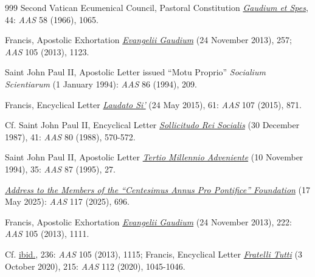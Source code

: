 \documentclass{article}
\begin{document}
\begin{thebibliography}{999}
 Second Vatican Ecumenical Council, Pastoral Constitution \href{https://www.vatican.va/archive/hist_councils/ii_vatican_council/documents/vat-ii_const_19651207_gaudium-et-spes_en.html}{\emph{Gaudium et Spes}}, 44: \emph{AAS} 58 (1966), 1065.

 Francis, Apostolic Exhortation \href{https://www.vatican.va/content/francesco/en/apost_exhortations/documents/papa-francesco_esortazione-ap_20131124_evangelii-gaudium.html}{\emph{Evangelii Gaudium}} (24 November 2013), 257; \emph{AAS} 105 (2013), 1123.

 Saint John Paul II, Apostolic Letter issued ``Motu Proprio'' \emph{Socialium Scientiarum} (1 January 1994): \emph{AAS} 86 (1994), 209.

 Francis, Encyclical Letter \href{https://www.vatican.va/content/francesco/en/encyclicals/documents/papa-francesco_20150524_enciclica-laudato-si.html}{\emph{Laudato Si'}} (24 May 2015), 61: \emph{AAS} 107 (2015), 871.

 Cf. Saint John Paul II, Encyclical Letter \href{https://www.vatican.va/content/john-paul-ii/en/encyclicals/documents/hf_jp-ii_enc_30121987_sollicitudo-rei-socialis.html}{\emph{Sollicitudo Rei Socialis}} (30 December 1987), 41: \emph{AAS} 80 (1988), 570-572.

 Saint John Paul II, Apostolic Letter \href{https://www.vatican.va/content/john-paul-ii/en/apost_letters/1994/documents/hf_jp-ii_apl_19941110_tertio-millennio-adveniente.html}{\emph{Tertio Millennio Adveniente}} (10 November 1994), 35: \emph{AAS} 87 (1995), 27.

 \href{https://www.vatican.va/content/leo-xiv/en/speeches/2025/may/documents/20250517-centesimus-annus-pro-pontifice.html}{\emph{Address to the Members of the ``Centesimus Annus Pro Pontifice'' Foundation}} (17 May 2025): \emph{AAS} 117 (2025), 696.

 Francis, Apostolic Exhortation \href{https://www.vatican.va/content/francesco/en/apost_exhortations/documents/papa-francesco_esortazione-ap_20131124_evangelii-gaudium.html}{\emph{Evangelii Gaudium}} (24 November 2013), 222: \emph{AAS} 105 (2013), 1111.

 Cf. \href{https://www.vatican.va/content/francesco/en/apost_exhortations/documents/papa-francesco_esortazione-ap_20131124_evangelii-gaudium.html}{ibid.}, 236: \emph{AAS} 105 (2013), 1115; Francis, Encyclical Letter \href{https://www.vatican.va/content/francesco/en/encyclicals/documents/papa-francesco_20201003_enciclica-fratelli-tutti.html}{\emph{Fratelli Tutti}} (3 October 2020), 215: \emph{AAS} 112 (2020), 1045-1046.


\end{thebibliography}
\end{document}
